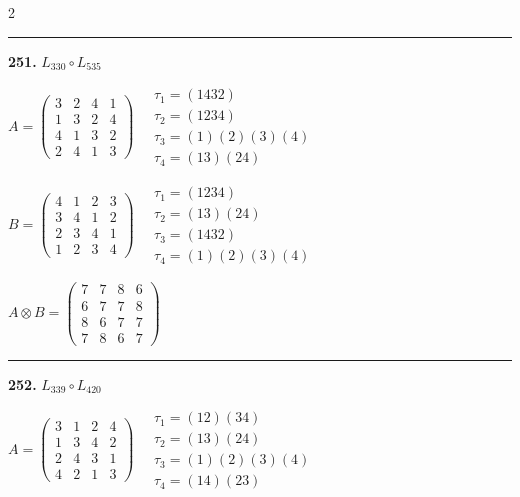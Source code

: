 \begin{multicols}{2}
\vspace{0.3em}
\hrule
\vspace{0.3em}

\noindent\textbf{251.} $L_{330} \circ L_{535}$

$A = \begin{pmatrix} 3 & 2 & 4 & 1 \\ 1 & 3 & 2 & 4 \\ 4 & 1 & 3 & 2 \\ 2 & 4 & 1 & 3 \end{pmatrix} \quad \begin{matrix} \tau_{1}=(1 4 3 2) \\ \tau_{2}=(1 2 3 4) \\ \tau_{3}=(1)(2)(3)(4) \\ \tau_{4}=(1 3)(2 4) \end{matrix}$

$B = \begin{pmatrix} 4 & 1 & 2 & 3 \\ 3 & 4 & 1 & 2 \\ 2 & 3 & 4 & 1 \\ 1 & 2 & 3 & 4 \end{pmatrix} \quad \begin{matrix} \tau_{1}=(1 2 3 4) \\ \tau_{2}=(1 3)(2 4) \\ \tau_{3}=(1 4 3 2) \\ \tau_{4}=(1)(2)(3)(4) \end{matrix}$

$A \otimes B = \begin{pmatrix} 7 & 7 & 8 & 6 \\ 6 & 7 & 7 & 8 \\ 8 & 6 & 7 & 7 \\ 7 & 8 & 6 & 7 \end{pmatrix}$

\vspace{0.3em}
\hrule
\vspace{0.3em}

\noindent\textbf{252.} $L_{339} \circ L_{420}$

$A = \begin{pmatrix} 3 & 1 & 2 & 4 \\ 1 & 3 & 4 & 2 \\ 2 & 4 & 3 & 1 \\ 4 & 2 & 1 & 3 \end{pmatrix} \quad \begin{matrix} \tau_{1}=(1 2)(3 4) \\ \tau_{2}=(1 3)(2 4) \\ \tau_{3}=(1)(2)(3)(4) \\ \tau_{4}=(1 4)(2 3) \end{matrix}$


\end{multicols}
